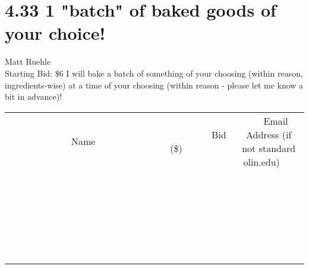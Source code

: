 \documentclass[11pt]{article}
\begin{document}
\section*{4.33 1 "batch" of baked goods of your choice!}
Matt Ruehle
\\
Starting Bid: \$6
\newline
I will bake a batch of something of your choosing (within reason, ingredients-wise) at a time of your choosing (within reason - please let me know a bit in advance)!
\\[6ex]
\begin{tabular}{c c c}
~~~~~~~~~~~~~Name~~~~~~~~~~~~~ & ~~~~~~~~~Bid (\$)~~~~~~~~~  & ~~~Email Address (if not standard olin.edu)~~~\\
 & & \\
\hline
 & & \\
\hline
 & & \\
\hline
 & & \\
\hline
 & & \\
\hline
 & & \\
\hline
 & & \\
\hline
 & & \\
\hline
 & & \\
\hline
 & & \\
\hline
 & & \\
\hline
 & & \\
\hline
 & & \\
\hline
 & & \\
\hline
 & & \\
\hline
 & & \\
\hline
 & & \\
\hline
 & & \\
\hline
 & & \\
\hline
 & & \\
\hline
 & & \\
\hline
 & & \\
\hline
 & & \\
\hline
 & & \\
\hline
 & & \\
\hline
 & & \\
\hline
\end{tabular}
\newpage
\end{document}
